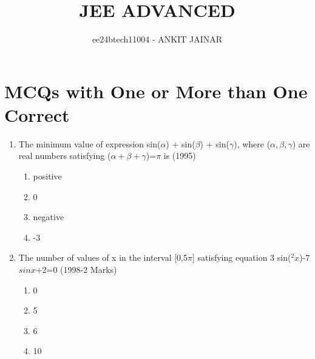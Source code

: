 \documentclass[journal,12pt,twocolumn]{IEEEtran}
\theoremstyle{remark}
\begin{document}

\vspace{3cm}

\title{JEE ADVANCED}
\author{ee24btech11004 - ANKIT JAINAR}
\maketitle
\newpage
\bigskip

\renewcommand{\thefigure}{\theenumi}
\renewcommand{\thetable}{\theenumi}
\section{MCQs with One or More than One Correct}
\begin{enumerate}
\item The minimum value of expression sin($\alpha$) + sin($\beta$) + sin($\gamma$), where ($\alpha,\beta,\gamma$) are real numbers satisfying ($\alpha+\beta+\gamma$)=$\pi$  is \hfill(1995)\
\begin{enumerate}
    \item positive
    \item 0
    \item negative 
    \item -3
\end{enumerate}
\item The number of values of x in the interval [0,5$\pi$] satisfying equation 3 sin($^2x$)-7$sinx$+2=0 \hfill(1998-2 Marks) \
\begin{enumerate}
    \item 0
    \item 5
    \item 6
    \item 10
\end{enumerate}


\end{enumerate}
\end{document}
